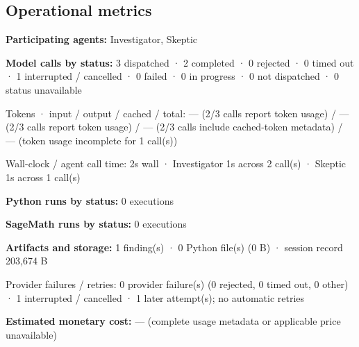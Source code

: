 \documentclass[11pt]{article}
\begin{document}
\subsection{Operational metrics}
\textbf{Participating agents:} Investigator, Skeptic\par
\textbf{Model calls by status:} 3 dispatched · 2 completed · 0 rejected · 0 timed out · 1 interrupted / cancelled · 0 failed · 0 in progress · 0 not dispatched · 0 status unavailable\par
Tokens · input / output / cached / total: — (2/3 calls report token usage) / — (2/3 calls report token usage) / — (2/3 calls include cached-token metadata) / — (token usage incomplete for 1 call(s))\par
Wall-clock / agent call time: 2s wall · Investigator 1s across 2 call(s) · Skeptic 1s across 1 call(s)\par
\textbf{Python runs by status:} 0 executions\par
\textbf{SageMath runs by status:} 0 executions\par
\textbf{Artifacts and storage:} 1 finding(s) · 0 Python file(s) (0 B) · session record 203,674 B\par
Provider failures / retries: 0 provider failure(s) (0 rejected, 0 timed out, 0 other) · 1 interrupted / cancelled · 1 later attempt(s); no automatic retries\par
\textbf{Estimated monetary cost:} — (complete usage metadata or applicable price unavailable)\par
\end{document}

